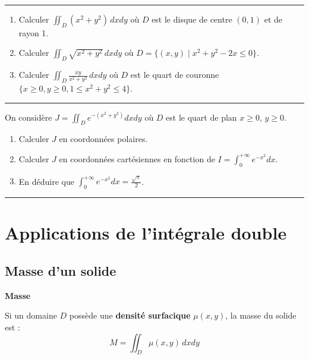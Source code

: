 \documentclass[../PolyS2.tex]{subfiles}
\begin{document}
\vspace{1em}\hrule\vspace{1em}


\begin{enumerate}
\item Calculer $\displaystyle\iint_D (x^2+y^2) \, dxdy$ où $D$ est le disque de centre $(0,1)$ et de rayon 1.

\item Calculer $\displaystyle\iint_D \sqrt{x^2+y^2} \, dxdy$ où $D = \{(x,y) \mid x^2+y^2-2x \leq 0\}$.

\item Calculer $\displaystyle\iint_D \frac{xy}{x^2+y^2} \, dxdy$ où $D$ est le quart de couronne $\{x \geq 0, y \geq 0, 1 \leq x^2+y^2 \leq 4\}$.
\end{enumerate}

\vspace{1em}\hrule\vspace{1em}


On considère $J = \displaystyle\iint_D e^{-(x^2+y^2)} dxdy$ où $D$ est le quart de plan $x \geq 0$, $y \geq 0$.

\begin{enumerate}
\item Calculer $J$ en coordonnées polaires.
\item Calculer $J$ en coordonnées cartésiennes en fonction de $I = \displaystyle\int_0^{+\infty} e^{-x^2} dx$.
\item En déduire que $\displaystyle\int_0^{+\infty} e^{-x^2} dx = \frac{\sqrt{\pi}}{2}$.
\end{enumerate}

\vspace{1em}\hrule\vspace{1em}
\newpage 

\section{Applications de l'intégrale double}

\subsection{Masse d'un solide}

\begin{Def}\textbf{Masse}

Si un domaine $D$ possède une \textbf{densité surfacique} $\mu(x,y)$, la masse du solide est :
$$M = \iint_D \mu(x,y) \, dxdy$$
\end{Def}
\end{document}

